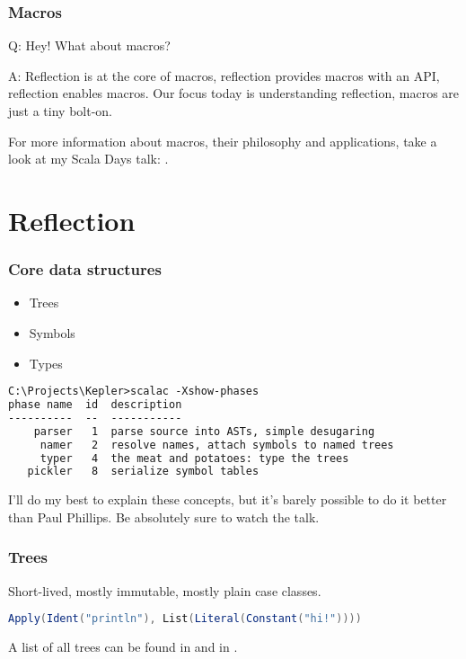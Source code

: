 \documentclass[hyperref={bookmarks=false}]{beamer}
\begin{document}
\begin{frame}[fragile]
\frametitle{Macros}

Q: Hey! What about macros?

A: Reflection is at the core of macros, reflection provides macros with an API, reflection enables macros.
Our focus today is understanding reflection, macros are just a tiny bolt-on.

For more information about macros, their philosophy and applications, take a look at my Scala Days talk:
.

\end{frame}

\section{Reflection}

\begin{frame}[fragile]
\frametitle{Core data structures}

\begin{itemize}
\item Trees
\item Symbols
\item Types
\end{itemize}

\begin{lstlisting}[language=XML]
C:\Projects\Kepler>scalac -Xshow-phases
phase name  id  description
----------  --  -----------
    parser   1  parse source into ASTs, simple desugaring
     namer   2  resolve names, attach symbols to named trees
     typer   4  the meat and potatoes: type the trees
   pickler   8  serialize symbol tables
\end{lstlisting}

I'll do my best to explain these concepts, but it's barely possible to do it better than Paul Phillips.
Be absolutely sure to watch the  talk.
\end{frame}

\begin{frame}[fragile]
\frametitle{Trees}

Short-lived, mostly immutable, mostly plain case classes.

\begin{lstlisting}[language=Scala]
Apply(Ident("println"), List(Literal(Constant("hi!"))))
\end{lstlisting}

A list of all trees can be found in
and in .

\end{frame}
\end{document}
